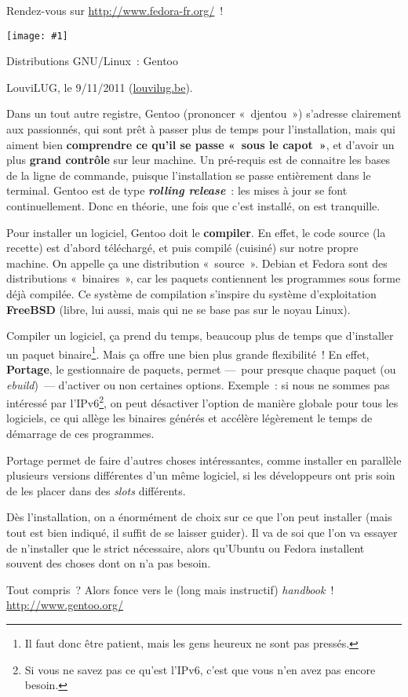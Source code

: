 \documentclass[a5paper,11pt]{article}
\def\titre#1#2{
  \noindent
  \begin{minipage}{0.14\linewidth}
  \texttt{[image: \#1]}
  \end{minipage}
  \begin{minipage}{0.85\linewidth}
    {\LARGE #2}

    \begin{flushright}
      LouviLUG, le 9/11/2011 (\url{louvilug.be}).
    \end{flushright}
  \end{minipage}

  \vspace{0.5cm}
}
\begin{document}
\bigskip Rendez-vous sur \url{http://www.fedora-fr.org/}~!

\pagebreak \titre{gentoo.pdf}{Distributions GNU/Linux~: Gentoo}

Dans un tout autre registre, Gentoo (prononcer «~djentou~») s'adresse clairement
aux passionnés, qui sont prêt à passer plus de temps pour l'installation, mais
qui aiment bien \textbf{comprendre ce qu'il se passe «~sous le capot~»}, et
d'avoir un plus \textbf{grand contrôle} sur leur machine. Un pré-requis est de
connaitre les bases de la ligne de commande, puisque l'installation se passe
entièrement dans le terminal. Gentoo est de type \textbf{\textit{rolling
release}}~: les mises à jour se font continuellement. Donc en théorie, une fois
que c'est installé, on est tranquille.


\bigskip Pour installer un logiciel, Gentoo doit le \textbf{compiler}. En effet,
le code source (la recette) est d'abord téléchargé, et puis compilé (cuisiné)
sur notre propre machine. On appelle ça une distribution «~source~». Debian et
Fedora sont des distributions «~binaires~», car les paquets contiennent les
programmes sous forme déjà compilée. Ce système de compilation s'inspire du
système d'exploitation \textbf{FreeBSD} (libre, lui aussi, mais qui ne se base
pas sur le noyau Linux).

Compiler un logiciel, ça prend du temps, beaucoup plus de temps que d'installer
un paquet binaire\footnote{Il faut donc être patient, mais les gens heureux ne
sont pas pressés.}. Mais ça offre une bien plus grande flexibilité~! En effet,
\textbf{Portage}, le gestionnaire de paquets, permet ---~pour presque chaque
paquet (ou \textit{ebuild})~--- d'activer ou non certaines options. Exemple~: si
nous ne sommes pas intéressé par l'IPv6\footnote{Si vous ne savez pas ce qu'est
l'IPv6, c'est que vous n'en avez pas encore besoin.}, on peut désactiver
l'option de manière globale pour tous les logiciels, ce qui allège les binaires
générés et accélère légèrement le temps de démarrage de ces programmes.

\bigskip Portage permet de faire d'autres choses intéressantes, comme installer
en parallèle plusieurs versions différentes d'un même logiciel, si les
développeurs ont pris soin de les placer dans des \textit{slots} différents.

\bigskip Dès l'installation, on a énormément de choix sur ce que l'on peut
installer (mais tout est bien indiqué, il suffit de se laisser guider). Il va de
soi que l'on va essayer de n'installer que le strict nécessaire, alors qu'Ubuntu
ou Fedora installent souvent des choses dont on n'a pas besoin.

\bigskip Tout compris~? Alors fonce vers le (long mais instructif)
\textit{handbook}~!\\ \url{http://www.gentoo.org/} \label{last-page}
\end{document}
